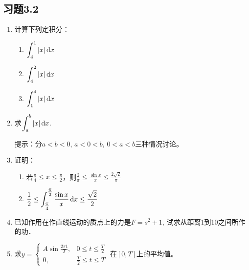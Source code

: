 \subsection*{习题3.2}
\begin{enumerate}
    \item 计算下列定积分：
\begin{multicols}{3}
\begin{enumerate}
    \item $\displaystyle\int^1_4 |x|\,{\rm d} x$
    \item $\displaystyle\int^2_4 |x|\,{\rm d} x$
    \item $\displaystyle\int^4_1 |x|\,{\rm d} x$
\end{enumerate}
\end{multicols}
\item 求$\displaystyle\int^b_a |x|\,{\rm d} x$.

提示：分$a<b<0$, $a<0<b$, $0<a<b$三种情况讨论。
\item 证明：
\begin{enumerate}
    \item 若$\frac{\pi}{4}\le x\le\frac{\pi}{2}$，则$\frac{2}{\pi}\le \frac{\sin x}{x}\le \frac{2\sqrt{2}}{\pi}$
    \item $\dfrac{1}{2}\le \displaystyle\int^{\tfrac{\pi}{2}}_{\tfrac{\pi}{4}}\dfrac{\sin x}{x}\,{\rm d} x\le \dfrac{\sqrt{2}}{2}$
\end{enumerate}
\item 已知作用在作直线运动的质点上的力是$F=s^2+1$, 试求从距离1到10之间所作的功．
\item 求$y=\begin{cases}
    A\sin\frac{2\pi t}{T}, & 0\le t\le \frac{T}{2}\\
    0,& \frac{T}{2}\le t\le T
\end{cases}$ 在$[0,T]$上的平均值。
\end{enumerate}
